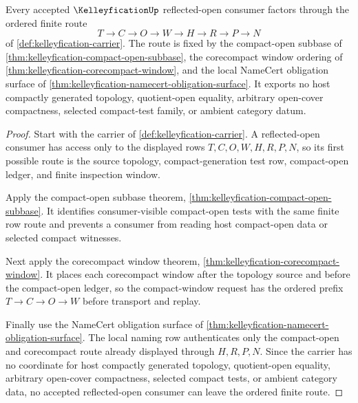 \begin{theorem}
\label{thm:kelleyfication-compact-window-scope-route}
Every accepted $\KelleyficationUp$ reflected-open consumer factors through the ordered finite route
$$
T \to C \to O \to W \to H \to R \to P \to N
$$
of \autoref{def:kelleyfication-carrier}. The route is fixed by the compact-open subbase of \autoref{thm:kelleyfication-compact-open-subbase}, the corecompact window ordering of \autoref{thm:kelleyfication-corecompact-window}, and the local NameCert obligation surface of \autoref{thm:kelleyfication-namecert-obligation-surface}. It exports no host compactly generated topology, quotient-open equality, arbitrary open-cover compactness, selected compact-test family, or ambient category datum.
\end{theorem}
\begin{proof}
Start with the carrier of \autoref{def:kelleyfication-carrier}. A reflected-open consumer has access only to the displayed rows $T,C,O,W,H,R,P,N$, so its first possible route is the source topology, compact-generation test row, compact-open ledger, and finite inspection window.

Apply the compact-open subbase theorem, \autoref{thm:kelleyfication-compact-open-subbase}. It identifies consumer-visible compact-open tests with the same finite row route and prevents a consumer from reading host compact-open data or selected compact witnesses.

Next apply the corecompact window theorem, \autoref{thm:kelleyfication-corecompact-window}. It places each corecompact window after the topology source and before the compact-open ledger, so the compact-window request has the ordered prefix $T \to C \to O \to W$ before transport and replay.

Finally use the NameCert obligation surface of \autoref{thm:kelleyfication-namecert-obligation-surface}. The local naming row authenticates only the compact-open and corecompact route already displayed through $H,R,P,N$. Since the carrier has no coordinate for host compactly generated topology, quotient-open equality, arbitrary open-cover compactness, selected compact tests, or ambient category data, no accepted reflected-open consumer can leave the ordered finite route.
\end{proof}

